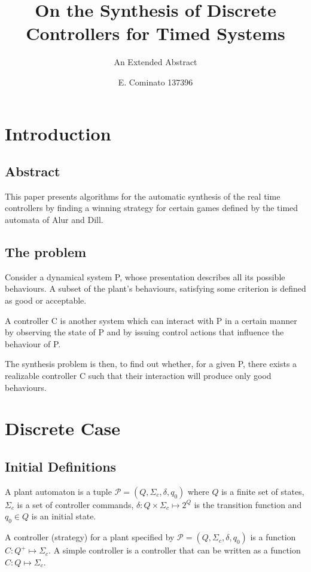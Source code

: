 \documentclass[table]{beamer}
\title[Automatic Verification] %
{On the Synthesis of Discrete Controllers for Timed Systems}
\subtitle{An Extended Abstract}
\author[Enrico] %
{E. Cominato 137396\inst{1}}
\institute %
{
	\inst{1}%
	Dipartimento di Scienze Matematiche, Informatiche e Fisiche\\
	Università degli studi di Udine
}
\date[VLC 2013] %
{}
\newcommand{\Plant}{\ensuremath{\mathcal{P}=(Q,\Sigma_c,\delta, q_0)}}
\newcommand{\Controller}{\ensuremath{C:Q^+\longmapsto \Sigma_c}}
\begin{document}
\frame{\titlepage}

\section{Introduction}
\subsection{Abstract}
\begin{frame}
This paper presents algorithms for the automatic synthesis of the real time controllers by finding a winning strategy for certain games defined by the timed automata of Alur and Dill.
\end{frame}

\subsection{The problem}
\begin{frame}
Consider a dynamical system P, whose presentation describes all its possible behaviours.
A subset of the plant's behaviours, satisfying some criterion is defined as good or acceptable.

\medskip

A controller C is another system which can interact with P in a certain manner by observing the state of P and by issuing control actions that influence the behaviour of P.
\end{frame}

\begin{frame}
The synthesis problem is then, to find out whether, for a given P, there exists a realizable controller C
such that their interaction will produce only good behaviours.
\end{frame}

\section{Discrete Case}
\subsection{Initial Definitions}
\begin{frame}
	\begin{dfn}[Plant]
		A plant automaton is a tuple $\Plant$ where
		$Q$ is a finite set of states, $\Sigma_c$ is a set of controller commands, 
		$\delta:Q \times \Sigma_c \longmapsto 2^Q$ is the transition function and 
		$q_0 \in Q$ is an initial state.
	\end{dfn}

	\begin{dfn}[Controllers]
		A controller (strategy) for a plant specified by $\Plant$ 
		is a function $\Controller$. A simple controller is a controller that 
		can be written as a function $C:Q \longmapsto \Sigma_c$.
	\end{dfn}
\end{frame}
\end{document}
